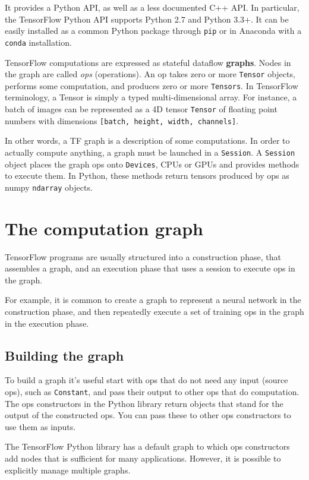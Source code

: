 It provides a Python API, as well as a less documented C++ API. In particular, the TensorFlow Python API supports Python 2.7 and Python 3.3+. It can be easily installed as a common Python package through \lstinline|pip| or in Anaconda with a \lstinline|conda| installation.

TensorFlow computations are expressed as stateful dataflow \textbf{graphs}. Nodes in the graph are called \emph{ops} (\ie operations). An op takes zero or more \lstinline|Tensor| objects, performs some computation, and produces zero or more \lstinline|Tensors|. In TensorFlow terminology, a Tensor is simply a typed multi-dimensional array. For instance, a batch of images can be represented as a 4D tensor \lstinline|Tensor| of floating point numbers with dimensions \lstinline|[batch, height, width, channels]|.

In other words, a \ac{TF} graph is a description of some computations. In order to actually compute anything, a graph must be launched in a \lstinline|Session|. A \lstinline|Session| object places the graph ops onto \lstinline|Devices|, \ie \acsp{CPU} or \acsp{GPU} and provides methods to execute them. In Python, these methods return tensors produced by ops as numpy \lstinline|ndarray| objects.

\section{The computation graph}

TensorFlow programs are usually structured into a construction phase, that assembles a graph, and an execution phase that uses a session to execute ops in the graph.

For example, it is common to create a graph to represent a neural network in the construction phase, and then repeatedly execute a set of training ops in the graph in the execution phase.

\subsection{Building the graph}

To build a graph it's useful start with ops that do not need any input (source ops), such as \lstinline|Constant|, and pass their output to other ops that do computation. The ops constructors in the Python library return objects that stand for the output of the constructed ops. You can pass these to other ops constructors to use them as inputs.

The TensorFlow Python library has a default graph to which ops constructors add nodes that is sufficient for many applications. However, it is possible to explicitly manage multiple graphs.

